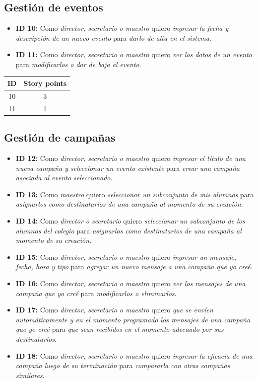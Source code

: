 \documentclass[a4paper, 10pt, twoside]{article}
\newenvironment{stories}{
  \begin{itemize}
}{
  \end{itemize}
}
\newcommand{\story}[4]{
  \item
  \textbf{ID #1:} Como \emph{#2} quiero \emph{#3} para \emph{#4}.
}
\begin{document}
\subsection{Gestión de eventos}

\begin{stories}
  \story{10}{director, secretario o maestro}
        {ingresar la fecha y descripción de un nuevo evento}
        {darlo de alta en el sistema} 

  \story{11}{director, secretario o maestro}
        {ver los datos de un evento}
        {modificarlos o dar de baja el evento} 
\end{stories}

\begin{center}
\begin{tabular}{|c|c|}
\hline
ID & Story points\\
\hline
10 & 3\\
11 & 1\\
\hline
\end{tabular}
\end{center}

\subsection{Gestión de campañas}

\begin{stories}
  \story{12}{director, secretario o maestro}
        {ingresar el título de una nueva campaña y seleccionar un evento existente}
        {crear una campaña asociada al evento seleccionado} 

  \story{13}{maestro}
        {seleccionar un subconjunto de mis alumnos}
        {asignarlos como destinatarios de una campaña al momento de su creación} 

  \story{14}{director o secretario}
        {seleccionar un subconjunto de los alumnos del colegio}
        {asignarlos como destinatarios de una campaña al momento de su creación} 

  \story{15}{director, secretario o maestro}
        {ingresar un mensaje, fecha, hora y tipo}
        {agregar un nuevo mensaje a una campaña que yo creé} 

  \story{16}{director, secretario o maestro}
        {ver los mensajes de una campaña que yo creé} 
        {modificarlos o eliminarlos}

  \story{17}{director, secretario o maestro}
        {que se envíen automáticamente y en el momento programado los mensajes de una campaña que yo creé}
        {que sean recibidos en el momento adecuado por sus destinatarios} 

  \story{18}{director, secretario o maestro}
        {ingresar la eficacia de una campaña luego de su terminación}
        {compararla con otras campañas similares} 
\end{stories}
\end{document}
